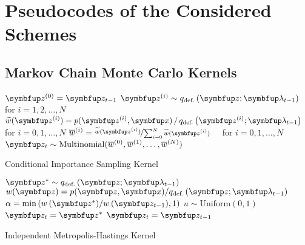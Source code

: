 
\section{Pseudocodes of the Considered Schemes}
\subsection{Markov Chain Monte Carlo Kernels}


  \begin{center}
\begin{minipage}[c]{0.63\textwidth}
  \begin{algorithm2e}[H]
    \DontPrintSemicolon
    \SetAlgoLined
    \(\vz^{(0)} = \vz_{t-1}\) \;
    \(\vz^{(i)} \sim q_{\text{def.}}\left(\vz;\vlambda_{t-1}\right)\quad\) for \(i = 1, 2,\ldots, N\) \;
    \(\widetilde{w}(\vz^{(i)}) = p(\vz^{(i)},\vx) \,/\, q_{\text{def.}}\left(\vz^{(i)}; \vlambda_{t-1}\right)\quad\) for \(i = 0, 1,\ldots, N\)\;
    \(\overline{w}^{(i)} = \nicefrac{\widetilde{w}(\vz^{(i)})}{ \sum^{N}_{i=0} \widetilde{w}(\vz^{(i)}) }\quad\) for \(i = 0, 1,\ldots, N\)\;
    \(\vz_{t} \sim \mathrm{Multinomial}(\overline{w}^{(0)}, \overline{w}^{(1)}, \ldots, \overline{w}^{(N)}) \)\;
    \caption{Conditional Importance Sampling Kernel}
  \end{algorithm2e}
\end{minipage}
  \end{center}

  \begin{center}
\begin{minipage}[c]{0.62\textwidth}
  \begin{algorithm2e}[H]
    \DontPrintSemicolon
    \SetAlgoLined
    \(\vz^* \sim q_{\text{def.}}\left(\vz; \vlambda_{t-1}\right)\)\;
    \(w(\vz) = p(\vz,\vx)/q_{\text{def.}}\left(\vz; \vlambda_{t-1}\right) \)\;
    \(\alpha = \min\left( w\,(\vz^*)/w\,(\vz_{t-1}), 1\right)\)\;
    \(u \sim \mathrm{Uniform}(0, 1) \)\;
        {
          \(\vz_t = \vz^*\)
        }
        {
          \(\vz_t = \vz_{t-1}\)
        }
        \caption{Independent Metropolis-Hastings Kernel}
  \end{algorithm2e}
\end{minipage}
  \end{center}

